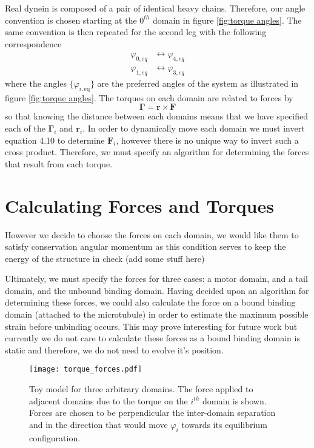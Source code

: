	
	Real dynein is composed of a pair of identical heavy chains. Therefore, our angle convention is chosen starting at the $0^{th}$ domain in figure \ref{fig:torque angles}. The same convention is then repeated for the second leg with the following correspondence 
	\begin{align}
		\varphi_{0,eq} &\longleftrightarrow \varphi_{4,eq} \\ 
		\varphi_{1,eq} &\longleftrightarrow \varphi_{3,eq}
	\end{align}
	where the angles $\{\varphi_{i, \text{eq}}\}$ are the preferred angles of the system as illustrated in figure \ref{fig:torque angles}. The torques on each domain are related to forces by 
	\begin{equation}
		\mathbf{\Gamma} = \mathbf{r}\times\mathbf{F}
	\end{equation}
	so that knowing the distance between each domains means that we have specified each of the $\mathbf{\Gamma}_i$ and $\mathbf{r}_i$. In order to dynamically move each domain we must invert equation 4.10 to determine $\mathbf{F}_i$, however there is no unique way to invert such a cross product. Therefore, we must specify an algorithm for determining the forces that result from each torque. 
	
	\section{Calculating Forces and Torques}
	However we decide to choose the forces on each domain, we would like them to satisfy  conservation angular momentum as this condition serves to keep the energy of the structure in check (add some stuff here) 
	
	Ultimately, we must specify the forces for three cases: a motor domain, and a tail domain, and the unbound binding domain. Having decided upon an algorithm for determining these forces, we could also calculate the force on a bound binding domain (attached to the microtubule) in order to estimate the maximum possible strain before unbinding occurs. This may prove interesting for future work but currently we do not care to calculate these forces as a bound binding domain is static and therefore, we do not need to evolve it's position. 
	
	\begin{figure}[!hbt]
		\centering
		\texttt{[image: torque\_forces.pdf]}
		\caption{Toy model for three arbitrary domains. The force applied to adjacent domains due to the torque on the $i^{th}$ domain is shown. Forces are chosen to be perpendicular the inter-domain separation and in the direction that would move $\varphi_i$ towards its equilibrium configuration.}
		\label{fig:torque_force}
	\end{figure}
	
